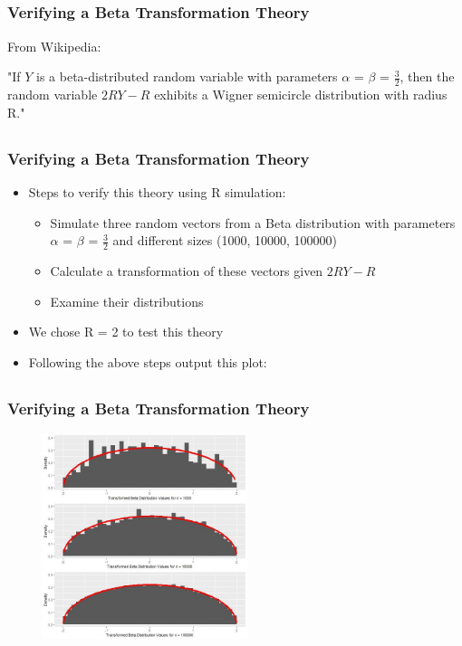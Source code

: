 \documentclass[handout, xcolor=dvipsnames]{beamer}
\begin{document}
\subsection{}
\begin{frame}
	\frametitle{Verifying a Beta Transformation Theory}
        From Wikipedia:
        \begin{center}
            "If $Y$ is a beta-distributed random variable with parameters $\alpha$ = $\beta$ = $\frac{3}{2}$, then the random variable $2RY-R$ exhibits a Wigner semicircle distribution with radius R."
        \end{center}
\end{frame}


\subsection{}
\begin{frame}
	\frametitle{Verifying a Beta Transformation Theory}
    \begin{itemize}
        \item Steps to verify this theory using R simulation:
        \begin{itemize}
            \item Simulate three random vectors from a Beta distribution with parameters $\alpha$ = $\beta$ = $\frac{3}{2}$ and different sizes (1000, 10000, 100000)
            \item Calculate a transformation of these vectors given $2RY-R$
            \item Examine their distributions
        \end{itemize}
        \item We chose R = 2 to test this theory
        \item Following the above steps output this plot:
    \end{itemize}
\end{frame}


\subsection{}
\begin{frame}
	\frametitle{Verifying a Beta Transformation Theory}
        \begin{center}
            \includegraphics[width=8cm,height=6cm]{Figures/BetaTrans.jpeg}
        \end{center}
\end{frame}
\end{document}
